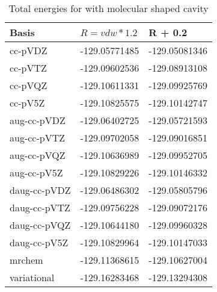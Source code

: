 \documentclass[../Thesis.tex]{subfiles}
\begin{document}
\begin{table}[htbp]
\caption{Total energies for  with molecular shaped cavity}
\begin{tabular}{l|r|r}
Basis & \multicolumn{1}{l|}{$R = vdw*1.2$} & \multicolumn{1}{l|}{R + 0.2} \\ \hline
cc-pVDZ & -129.05771485 & -129.05081346 \\
cc-pVTZ & -129.09602536 & -129.08913108 \\
cc-pVQZ & -129.10611331 & -129.09925769 \\
cc-pV5Z & -129.10825575 & -129.10142747 \\ \hline
aug-cc-pVDZ & -129.06402725 & -129.05721593 \\
aug-cc-pVTZ & -129.09702058 & -129.09016851 \\
aug-cc-pVQZ & -129.10636989 & -129.09952705 \\
aug-cc-pV5Z & -129.10829226 & -129.10146332 \\ \hline
daug-cc-pVDZ & -129.06486302 & -129.05805796 \\
daug-cc-pVTZ & -129.09756228 & -129.09072176 \\
daug-cc-pVQZ & -129.10644180 & -129.09960328 \\
daug-cc-pV5Z & -129.10829964 & -129.10147033 \\ \hline
mrchem & -129.11368615 & -129.10627004 \\
variational & -129.16283468 & -129.13294308 \\
\end{tabular}
\label{tab:noprawdataabc}
\end{table}
\end{document}
